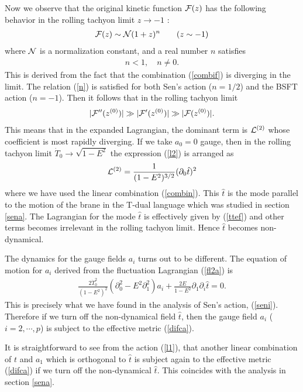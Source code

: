 \documentclass[a4paper,12pt]{article}
\newcommand{\p}{\partial}
\begin{document}
Now we observe that the original kinetic function ${\cal F}(z)$ has the 
following behavior in the rolling tachyon limit 
$z \rightarrow -1$ :  \begin{eqnarray}
 {\cal F}(z) \sim {\cal N}(1+z)^n \qquad (z \sim -1)
\end{eqnarray}
where ${\cal N}$ is a normalization constant, and 
a real number $n$ satisfies 
\begin{eqnarray}
 n<1, \quad n\neq 0.
\label{n}
\end{eqnarray}
This is derived from the fact that the
combination (\ref{combif}) is diverging in the limit.
The relation (\ref{n}) is satisfied for both Sen's action
($n=1/2$) and the BSFT action ($n=-1$). 
Then it follows that in the rolling tachyon limit 
\begin{eqnarray}
 |{\cal F}''(z^{(0)})| \gg 
 |{\cal F}'(z^{(0)})| \gg 
 |{\cal F}(z^{(0)})| .
\label{fff}
\end{eqnarray}
This means that in the expanded Lagrangian, the  dominant term is 
${\cal L}^{(2)}$ whose coefficient is most rapidly diverging. 
If we take $a_0=0$ gauge, then in the rolling tachyon limit 
$\dot{T}_0 \rightarrow \sqrt{1-E^2}$
the expression (\ref{l2}) is arranged as
\begin{eqnarray}
 {\cal L}^{(2)} = \frac{1}{(1-E^2)^{3/2}} (\p_0 \hat{t})^2
\label{ttef}
\end{eqnarray}
where we have used the linear combination (\ref{combin}).
This $\hat{t}$ is the mode parallel to the motion of the brane in the  
T-dual language which was studied in section \ref{sena}.
The Lagrangian for the mode $\hat{t}$ is effectively given by 
(\ref{ttef}) and other terms becomes irrelevant in the rolling tachyon
limit. Hence $\hat{t}$ becomes non-dynamical.

The dynamics for the gauge fields $a_i$ turns out to be different. 
The equation of motion for $a_i$ derived from the fluctuation Lagrangian
(\ref{fl2a}) is
\begin{eqnarray}
 \frac{2 \dot{T}_0^2}{(1-E^2)^2} \left(\p_0^2 - E^2 \p_1^2\right)a_i
 + \frac{2E}{1-E^2}\p_1 \p_i \hat{t} =0.
\end{eqnarray}
This is precisely what we have found in the analysis of 
Sen's action, (\ref{seni}).
Therefore if we turn off the non-dynamical field $\hat{t}$, then the
gauge field $a_i$ ($i=2,\cdots,p$) is subject to the effective metric 
(\ref{difca}). 

It is straightforward to see from the action (\ref{l1}), 
that another linear combination of $t$ and
$a_1$ which is orthogonal to $\hat{t}$ is subject again to the
effective metric (\ref{difca}) if we turn off the non-dynamical
$\hat{t}$. This coincides with the analysis in section \ref{sena}.
\end{document}
